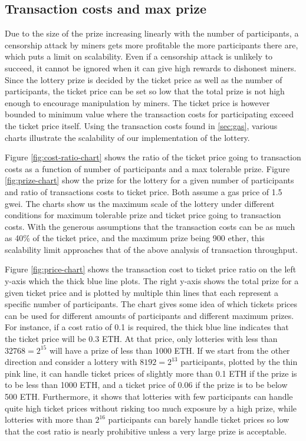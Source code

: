 \subsection{Transaction costs and max prize}

Due to the size of the prize increasing linearly with the number of participants, a censorship attack by miners gets more profitable the more participants there are, which puts a limit on scalability. Even if a censorship attack is unlikely to succeed, it cannot be ignored when it can give high rewards to dishonest miners. Since the lottery prize is decided by the ticket price as well as the number of participants, the ticket price can be set so low that the total prize is not high enough to encourage manipulation by miners. The ticket price is however bounded to minimum value where the transaction costs for participating exceed the ticket price itself. Using the transaction costs found in \ref{sec:gas}, various charts illustrate the scalability of our implementation of the lottery.

Figure \ref{fig:cost-ratio-chart} shows the ratio of the ticket price going to transaction costs as a function of number of participants and a max tolerable prize. Figure \ref{fig:prize-chart} show the prize for the lottery for a given number of participants and ratio of transactions costs to ticket price. Both assume a gas price of 1.5 gwei.
The charts show us the maximum scale of the lottery under different conditions for maximum tolerable prize and ticket price going to transaction costs. With the generous assumptions that the transaction costs can be as much as 40\% of the ticket price, and the maximum prize being 900 ether, this scalability limit approaches that of the above analysis of transaction throughput.

Figure \ref{fig:price-chart} shows the transaction cost to ticket price ratio on the left y-axis which the thick blue line plots. The right y-axis shows the total prize for a given ticket price and is plotted by multiple thin lines that each represent a specific number of participants. The chart gives some idea of which tickets prices can be used for different amounts of participants and different maximum prizes. For instance, if a cost ratio of 0.1 is required, the thick blue line indicates that the ticket price will be 0.3 ETH. At that price, only lotteries with less than $32768=2^{15}$ will have a prize of less than 1000 ETH. If we start from the other direction and consider a lottery with $8192=2^{13}$ participants, plotted by the thin pink line, it can handle ticket prices of slightly more than 0.1 ETH if the prize is to be less than 1000 ETH, and a ticket price of 0.06 if the prize is to be below 500 ETH. Furthermore, it shows that lotteries with few participants can handle quite high ticket prices without risking too much exposure by a high prize, while lotteries with more than $2^{16}$ participants can barely handle ticket prices so low that the cost ratio is nearly prohibitive unless a very large prize is acceptable.

